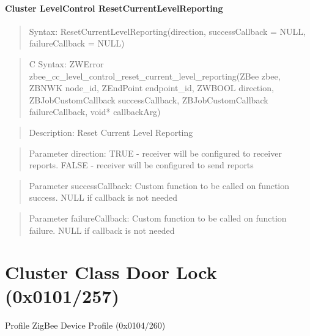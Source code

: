 \paragraph{Cluster LevelControl ResetCurrentLevelReporting}
\begin{quote}Syntax: ResetCurrentLevelReporting(direction, successCallback = NULL, failureCallback = NULL)\end{quote}
\begin{quote}C Syntax: ZWError zbee\_cc\_level\_control\_reset\_current\_level\_reporting(ZBee zbee, ZBNWK node\_id, ZEndPoint endpoint\_id, ZWBOOL direction, ZBJobCustomCallback successCallback, ZBJobCustomCallback failureCallback, void* callbackArg)\end{quote}
\begin{quote}Description: Reset Current Level Reporting\end{quote}
\begin{quote}Parameter direction: TRUE  - receiver will be configured to receiver reports. FALSE - receiver will be configured to send reports\end{quote}
\begin{quote}Parameter successCallback: Custom function to be called on function success. NULL if callback is not needed\end{quote}
\begin{quote}Parameter failureCallback: Custom function to be called on function failure. NULL if callback is not needed\end{quote}



\section{Cluster Class Door Lock (0x0101/257)}

Profile ZigBee Device Profile (0x0104/260)

